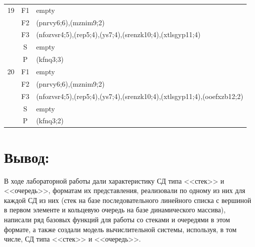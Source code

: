 \documentclass[12pt]{article}
\begin{document}
{\begin{tabular}{|c|c|l|}
		19 & F1 & empty\\ 
		\cline{2-3}
		& F2 & (pnrvy6;6),(mznim9;2)\\
		\cline{2-3}
		& F3 & (nfozvsr4;5),(rep5;4),(ys7;4),(srenzk10;4),(xtlsgyp11;4)\\
		\cline{2-3}
		& S & empty\\
		\cline{2-3}
		& P & (kfnq3;3)\\
		\hline
		
		20 & F1 & empty\\ 
		\cline{2-3}
		& F2 & (pnrvy6;6),(mznim9;2)\\
		\cline{2-3}
		& F3 & (nfozvsr4;5),(rep5;4),(ys7;4),(srenzk10;4),(xtlsgyp11;4),(ooefxzb12;2)\\
		\cline{2-3}
		& S & empty\\
		\cline{2-3}
		& P & (kfnq3;2)\\
		\hline
	\end{tabular}
	
	\section{Вывод:}
	
	В ходе лабораторной работы дали характеристику СД типа <<стек>> и <<очередь>>, форматам их представления, реализовали по одному из них для каждой СД из них (стек на базе последовательного линейного списка с вершиной в первом элементе и кольцевую очередь на базе динамического массива), написали ряд базовых функций для работы со стеками и очередями в этом формате, а также создали модель вычислительной системы, используя, в том числе, СД типа <<стек>> и <<очередь>>.
}
\end{document}
